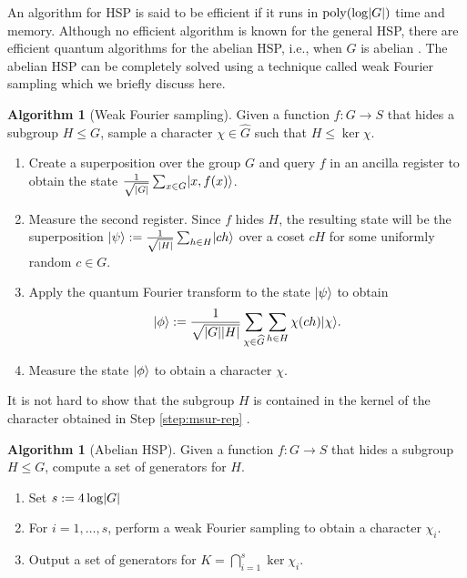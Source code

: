 \documentclass[11pt]{article}
\theoremstyle{plain}
\theoremstyle{definition}
\newtheorem{algo-thm}[theorem]{Algorithm}
\DeclareMathOperator{\poly}{poly}
\DeclarePairedDelimiter{\abs}{\lvert}{\rvert}
\DeclarePairedDelimiter{\ket}{\lvert}{\rangle}
\begin{document}
An algorithm for HSP is said to be efficient if it runs in $\poly(\log \abs{G})$ time and memory. 
Although no efficient algorithm is known for the general HSP, there are efficient quantum algorithms 
for the abelian HSP, i.e., when $G$ is abelian \cite{hallgren2003hidden, kaye2007introduction}. The abelian HSP can be completely solved using a 
technique called weak Fourier sampling which we briefly discuss here.

\begin{algo-thm}[Weak Fourier sampling]
	\label{alg:wfs}
	Given a function $f: G \rightarrow S$ that hides a subgroup $H \le G$, sample a	character $\chi \in \widehat{G}$ such that $H \le \ker\chi$.
	\begin{enumerate}[topsep = 0pt, itemsep = 0pt, parsep = 0pt]
		\item Create a superposition over the group $G$ and query $f$ in an ancilla register to 
		obtain the state $\frac{1}{\sqrt{\abs{G}}} \sum_{x \in G} \ket{x, f(x)}$.
		\item Measure the second register. Since $f$ hides $H$, the resulting state will be the  
		superposition $\ket{\psi} := \frac{1}{\sqrt{\abs{H}}} \sum_{h \in H} \ket{ch}$ 
		over a coset $cH$ for some uniformly random $c \in G$.
		\item Apply the quantum Fourier transform to the state $\ket{\psi}$ to obtain
		\[ \ket{\phi} := \frac{1}{\sqrt{\abs{G}\abs{H}}} \sum_{\chi \in \widehat{G}} \sum_{h \in H} 
		\chi(ch) \ket{\chi}. \]
		\item\label{step:msur-rep} Measure the state $\ket{\phi}$ to obtain a character $\chi$.
	\end{enumerate}
\end{algo-thm}

It is not hard to show that the subgroup $H$ is contained in the kernel of the character
obtained in Step \ref{step:msur-rep} \cite{hallgren2003hidden}. 

\begin{algo-thm}[Abelian HSP]
	\label{alg:ahsp}
	Given a function $f: G \rightarrow S$ that hides a subgroup $H \le G$, compute a set of 
	generators for $H$.
	\begin{enumerate}[topsep = 0pt, itemsep = 0pt, parsep = 0pt]
		\item Set $s := 4\log \abs{G}$
		\item\label{step:hsp:loop} For $i = 1, \dots, s$, perform a weak Fourier sampling to obtain 
		a character $\chi_i$.
		\item\label{step:ker} Output a set of generators for $K = \bigcap_{i = 1}^s \ker \chi_i$.
	\end{enumerate}
\end{algo-thm}
\end{document}
